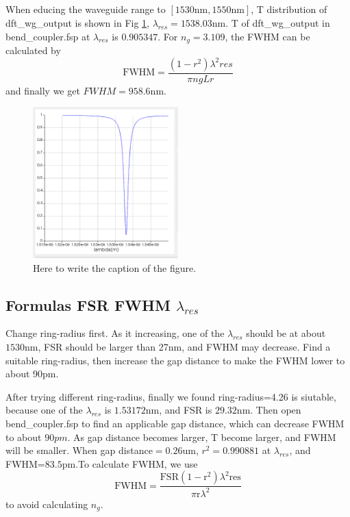 \documentclass[fontsize=11pt]{scrartcl}
\begin{document}
\subsection{}
When educing the waveguide range to $[1530\mathrm{nm},1550\mathrm{nm}]$, 
T distribution of dft\_wg\_output is shown in Fig \ref{fig3.2}, 
$\lambda_{res}=1538.03\mathrm{nm}$. 
T of dft\_wg\_output in bend\_coupler.fsp at $\lambda_{res}$ is $0.905347$. 
For $n_g=3.109$, the FWHM can be calculated by 
\begin{equation}
    \mathrm{FWHM}=\frac{\left(1-r^{2}\right) \lambda^{2} r e s}{\pi n g L r}
    \label{eq4}
\end{equation}
and finally we get $FWHM=958.6\mathrm{nm}$.
\begin{figure}[H]
    \centering
     \includegraphics[width=0.5\textwidth]{img/fig3.2.png}
     \caption{Here to write the caption of the figure.}
     \label{fig3.2}
\end{figure}  
\subsection{Formulas FSR FWHM $\lambda_{res}$}
Change ring-radius first. 
As it increasing, one of the $\lambda_{res}$ should be at about $1530\mathrm{nm}$, 
FSR should be larger than 27nm, and FWHM may decrease. 
Find a suitable ring-radius, then increase the gap distance to make the FWHM lower 
to about 90pm.

After trying different ring-radius, finally we found ring-radius=4.26 is siutable, 
because one  of the $\lambda_{res}$ is $1.53172\mathrm{nm}$, and FSR is $29.32\mathrm{nm}$. 
Then open bend\_coupler.fsp to find an applicable gap distance, 
which can decrease FWHM to about $90pm$. As gap distance becomes larger,
 T become larger, and FWHM will be smaller. When gap distance$=0.26\mathrm{um}$, $r^2=0.990881$ at $\lambda_{res}$, 
 and FWHM=$83.5\mathrm{pm}$.To calculate FWHM, we use
 \begin{equation}
    \mathrm{FWHM}=\frac{\mathrm{FSR}\left(1-\mathrm{r}^{2}\right) \lambda^{2} \mathrm{res}}{\pi \mathrm{r} \lambda^{2}}
    \label{eq5}
\end{equation}
 to avoid calculating $n_g$.
\pagebreak
\end{document}
